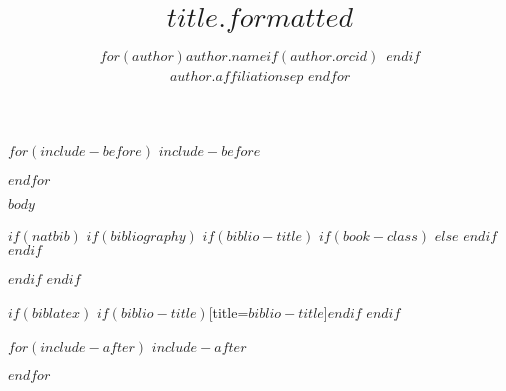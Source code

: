 \documentclass[
$for(classoption)$
  $classoption$$sep$,
$endfor$
]{$documentclass$}
\author{
$for(author)$$author.name$$if(author.orcid)$~\orcidlink{$author.orcid$}$endif$\\$author.affiliation$$sep$ \And $endfor$
}
\title{$title.formatted$}
\begin{document}
$for(include-before)$
$include-before$

$endfor$


$body$

$if(natbib)$
$if(bibliography)$
$if(biblio-title)$
$if(book-class)$
\renewcommand\bibname{$biblio-title$}
$else$
\renewcommand\refname{$biblio-title$}
$endif$
$endif$

$endif$
$endif$

$if(biblatex)$
\printbibliography$if(biblio-title)$[title=$biblio-title$]$endif$
$endif$

$for(include-after)$
$include-after$

$endfor$
\end{document}
